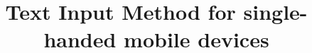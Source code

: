 \documentclass{acm_proc_article-sp}
\begin{document}
\title{Text Input Method for single-handed mobile devices}

%
%
%
%
%
\end{document}
